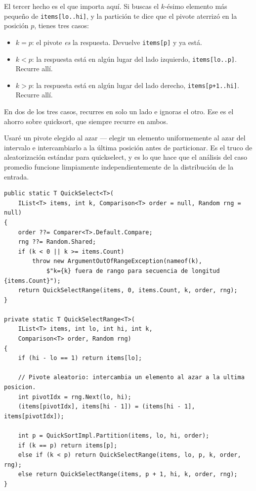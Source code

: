 \documentclass[11pt,a4paper]{article}
\begin{document}
El tercer hecho es el que importa aquí. Si buscas el $k$-ésimo elemento más pequeño de \texttt{items[lo..hi]}, y la partición te dice que el pivote aterrizó en la posición $p$, tienes tres casos:

\begin{itemize}
\item $k = p$: el pivote \emph{es} la respuesta. Devuelve \texttt{items[p]} y ya está.
\item $k < p$: la respuesta está en algún lugar del lado izquierdo, \texttt{items[lo..p]}. Recurre allí.
\item $k > p$: la respuesta está en algún lugar del lado derecho, \texttt{items[p+1..hi]}. Recurre allí.
\end{itemize}

En dos de los tres casos, recurres en solo un lado e ignoras el otro. Ese es el ahorro sobre quicksort, que siempre recurre en ambos.

Usaré un pivote elegido al azar --- elegir un elemento uniformemente al azar del intervalo e intercambiarlo a la última posición antes de particionar. Es el truco de aleatorización estándar para quickselect, y es lo que hace que el análisis del caso promedio funcione limpiamente independientemente de la distribución de la entrada.

\begin{lstlisting}[caption={Quickselect}]
public static T QuickSelect<T>(
    IList<T> items, int k, Comparison<T> order = null, Random rng = null)
{
    order ??= Comparer<T>.Default.Compare;
    rng ??= Random.Shared;
    if (k < 0 || k >= items.Count)
        throw new ArgumentOutOfRangeException(nameof(k),
            $"k={k} fuera de rango para secuencia de longitud {items.Count}");
    return QuickSelectRange(items, 0, items.Count, k, order, rng);
}

private static T QuickSelectRange<T>(
    IList<T> items, int lo, int hi, int k,
    Comparison<T> order, Random rng)
{
    if (hi - lo == 1) return items[lo];

    // Pivote aleatorio: intercambia un elemento al azar a la ultima posicion.
    int pivotIdx = rng.Next(lo, hi);
    (items[pivotIdx], items[hi - 1]) = (items[hi - 1], items[pivotIdx]);

    int p = QuickSortImpl.Partition(items, lo, hi, order);
    if (k == p) return items[p];
    else if (k < p) return QuickSelectRange(items, lo, p, k, order, rng);
    else return QuickSelectRange(items, p + 1, hi, k, order, rng);
}
\end{lstlisting}
\end{document}
